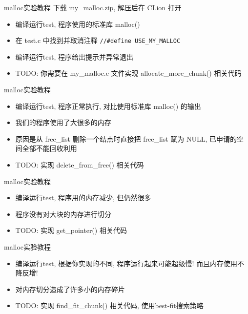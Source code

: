 \begin{frame}[fragile]{malloc实验教程}
    下载 \href{http://problemoverflow.top/download/my\_malloc.zip}{my\_malloc.zip}, 解压后在 CLion 打开
    \begin{itemize}[<+- | alert@+>]
        \item 编译运行test, 程序使用的标准库 malloc()
        \item 在 test.c 中找到并取消注释 \texttt{//\#define USE\_MY\_MALLOC}
        \item 编译运行test, 程序给出提示并异常退出
        \item TODO: 你需要在 my\_malloc.c 文件实现 allocate\_more\_chunk() 相关代码
    \end{itemize}
\end{frame}

\begin{frame}[fragile]{malloc实验教程}
    \begin{itemize}[<+- | alert@+>]
        \item 编译运行test, 程序正常执行, 对比使用标准库 malloc() 的输出
        \item 我们的程序使用了大很多的内存
        \item 原因是从 free\_list 删除一个结点时直接把 free\_list 赋为 NULL, 已申请的空间全部不能回收利用
        \item TODO: 实现 delete\_from\_free() 相关代码
    \end{itemize}
\end{frame}

\begin{frame}[fragile]{malloc实验教程}
    \begin{itemize}[<+- | alert@+>]
        \item 编译运行test, 程序用的内存减少, 但仍然很多
        \item 程序没有对大块的内存进行切分
        \item TODO: 实现 get\_pointer() 相关代码
    \end{itemize}
\end{frame}

\begin{frame}[fragile]{malloc实验教程}
    \begin{itemize}[<+- | alert@+>]
        \item 编译运行test, 根据你实现的不同, 程序运行起来可能超级慢! 而且内存使用不降反增!
        \item 对内存切分造成了许多小的内存碎片
        \item TODO: 实现 find\_fit\_chunk() 相关代码, 使用best-fit搜索策略
    \end{itemize}
\end{frame}

